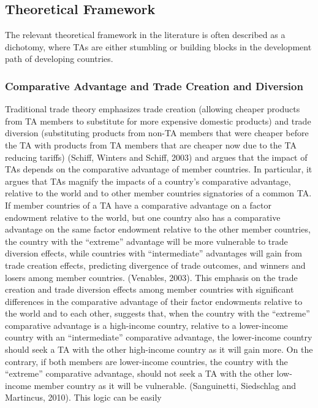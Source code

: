 \documentclass[12pt]{article}%
\begin{document}
\subsection{Theoretical Framework}%
\label{subsec:TheoreticalFramework}%
The relevant theoretical framework in the literature is often described as a dichotomy, where TAs are either stumbling or building blocks in the development path of developing countries.%
\subsubsection{Comparative Advantage and Trade Creation and Diversion}%
\label{ssubsec:ComparativeAdvantageandTradeCreationandDiversion}%

%
Traditional trade theory emphasizes trade creation (allowing cheaper
products from TA members to substitute for more expensive domestic
products) and trade diversion (substituting products from non-TA members
that were cheaper before the TA with products from TA members that are
cheaper now due to the TA reducing tariffs) (Schiff, Winters and Schiff,
2003) and argues that the impact of TAs depends on the comparative
advantage of member countries. In particular, it argues that TAs magnify
the impacts of a country's comparative advantage, relative to the world
and to other member countries signatories of a common TA. If member
countries of a TA have a comparative advantage on a factor endowment
relative to the world, but one country also has a comparative advantage
on the same factor endowment relative to the other member countries, the
country with the ``extreme'' advantage will be more vulnerable to trade
diversion effects, while countries with ``intermediate'' advantages will
gain from trade creation effects, predicting divergence of trade
outcomes, and winners and losers among member countries. (Venables,
2003). This emphasis on the trade creation and trade diversion effects
among member countries with significant differences in the comparative
advantage of their factor endowments relative to the world and to each
other, suggests that, when the country with the ``extreme'' comparative
advantage is a high-income country, relative to a lower-income country
with an ``intermediate'' comparative advantage, the lower-income country
should seek a TA with the other high-income country as it will gain
more. On the contrary, if both members are lower-income countries, the
country with the ``extreme'' comparative advantage, should not seek a TA
with the other low-income member country as it will be vulnerable.
(Sanguinetti, Siedschlag and Martincus, 2010). This logic can be easily
\end{document}
